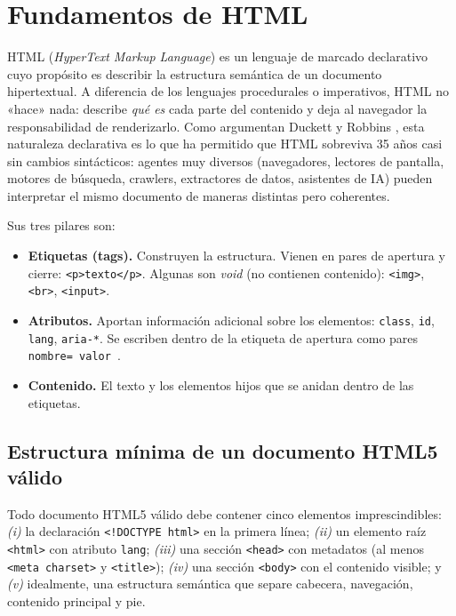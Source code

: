\section{Fundamentos de HTML}

HTML (\emph{HyperText Markup Language}) es un lenguaje de marcado
declarativo cuyo propósito es describir la estructura semántica de
un documento hipertextual. A diferencia de los lenguajes
procedurales o imperativos, HTML no «hace» nada: describe
\emph{qué es} cada parte del contenido y deja al navegador la
responsabilidad de renderizarlo. Como argumentan Duckett
\cite{duckett2011html} y Robbins \cite{robbins2018learning}, esta
naturaleza declarativa es lo que ha permitido que HTML sobreviva 35
años casi sin cambios sintácticos: agentes muy diversos
(navegadores, lectores de pantalla, motores de búsqueda, crawlers,
extractores de datos, asistentes de IA) pueden interpretar el mismo
documento de maneras distintas pero coherentes.

Sus tres pilares son:

\begin{itemize}
\item \textbf{Etiquetas (tags).} Construyen la estructura. Vienen
en pares de apertura y cierre: \texttt{<p>texto</p>}. Algunas son
\emph{void} (no contienen contenido): \texttt{<img>}, \texttt{<br>},
\texttt{<input>}.
\item \textbf{Atributos.} Aportan información adicional sobre los
elementos: \texttt{class}, \texttt{id}, \texttt{lang},
\texttt{aria-*}. Se escriben dentro de la etiqueta de apertura como
pares \texttt{nombre= valor }.
\item \textbf{Contenido.} El texto y los elementos hijos que se
anidan dentro de las etiquetas.
\end{itemize}

\subsection{Estructura mínima de un documento HTML5 válido}

Todo documento HTML5 válido debe contener cinco elementos
imprescindibles: \emph{(i)} la declaración \texttt{<!DOCTYPE html>}
en la primera línea; \emph{(ii)} un elemento raíz \texttt{<html>} con
atributo \texttt{lang}; \emph{(iii)} una sección \texttt{<head>} con
metadatos (al menos \texttt{<meta charset>} y \texttt{<title>});
\emph{(iv)} una sección \texttt{<body>} con el contenido visible; y
\emph{(v)} idealmente, una estructura semántica que separe cabecera,
navegación, contenido principal y pie.

